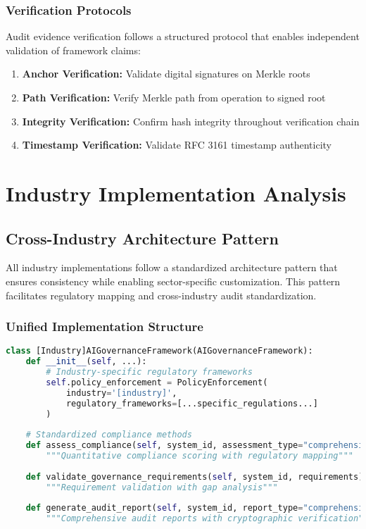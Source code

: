 \documentclass[12pt,a4paper]{article}
\begin{document}
\subsubsection{Verification Protocols}

Audit evidence verification follows a structured protocol that enables independent validation of framework claims:

\begin{enumerate}
\item \textbf{Anchor Verification:} Validate digital signatures on Merkle roots
\item \textbf{Path Verification:} Verify Merkle path from operation to signed root
\item \textbf{Integrity Verification:} Confirm hash integrity throughout verification chain
\item \textbf{Timestamp Verification:} Validate RFC 3161 timestamp authenticity
\end{enumerate}

\section{Industry Implementation Analysis}

\subsection{Cross-Industry Architecture Pattern}

All industry implementations follow a standardized architecture pattern that ensures consistency while enabling sector-specific customization. This pattern facilitates regulatory mapping and cross-industry audit standardization.

\subsubsection{Unified Implementation Structure}

\begin{lstlisting}[language=Python, caption=Industry Framework Pattern]
class [Industry]AIGovernanceFramework(AIGovernanceFramework):
    def __init__(self, ...):
        # Industry-specific regulatory frameworks
        self.policy_enforcement = PolicyEnforcement(
            industry='[industry]',
            regulatory_frameworks=[...specific_regulations...]
        )
    
    # Standardized compliance methods
    def assess_compliance(self, system_id, assessment_type="comprehensive"):
        """Quantitative compliance scoring with regulatory mapping"""
    
    def validate_governance_requirements(self, system_id, requirements):
        """Requirement validation with gap analysis"""
    
    def generate_audit_report(self, system_id, report_type="comprehensive"):
        """Comprehensive audit reports with cryptographic verification"""
\end{lstlisting}
\end{document}
